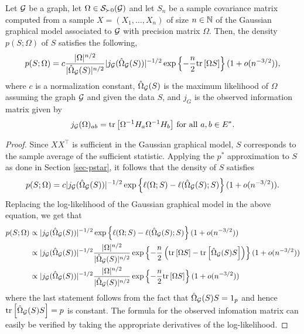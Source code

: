 \begin{lemma} \label{lem-pstar-covariance}
    Let ${\mathcal{G}}$ be a graph, let $\Omega \in {\mathcal{S}}_{\succ 0}({\mathcal{G}})$ and let $S_n$ be a sample covariance matrix computed from a sample $X = (X_1, \ldots, X_n)$ of size $n \in \mathbb{N}$ of the Gaussian graphical model associated to ${\mathcal{G}}$ with precision matrix $\Omega$. Then, the density $p(S; \Omega)$ of $S$ satisfies the following,
    \begin{equation*}
        p(S; \Omega) = c \frac{|\Omega|^{n/2}}{|\hat\Omega_{\mathcal{G}}(S)|^{n/2}} |j_{\mathcal{G}}(\hat\Omega_{\mathcal{G}}(S)) |^{-1/2} \exp\left\{-\frac{n}{2} {\textrm{tr}\left[\Omega S\right]}\right\} (1 + o(n^{-3/2})),
    \end{equation*}
    where $c$ is a normalization constant, $\hat\Omega_{\mathcal{G}}(S)$ is the maximum likelihood of $\Omega$ assuming the graph ${\mathcal{G}}$ and given the data $S$, and $j_G$ is the observed information matrix given by
    \begin{equation} \label{eq-obs-info}
        j_{\mathcal{G}}(\Omega)_{a b} = {\textrm{tr}\left[\Omega^{-1} H_a \Omega^{-1} H_b\right]} {\textrm{ for all }} a, b  \in E^*.
    \end{equation}
\end{lemma}

\begin{proof}
    Since $XX^\top$ is sufficient in the Gaussian graphical model, $S$ corresponds to the sample average of the sufficient statistic. Applying the $p^*$ approximation to $S$ as done in Section \ref{sec-pstar}, it follows that the density of $S$ satisfies
    \begin{equation*}
        p(S; \Omega) = c |j_{\mathcal{G}}(\hat\Omega_{\mathcal{G}}(S))|^{-1/2} \exp\left\{\ell(\Omega; S) - \ell(\hat\Omega_{\mathcal{G}}(S); S)\right\} (1 + o(n^{-3/2})).
    \end{equation*}
    Replacing the log-likelihood of the Gaussian graphical model in the above equation, we get that
    \begin{align*}
        p(S; \Omega) 
        &\propto |j_{\mathcal{G}}(\hat\Omega_{\mathcal{G}}(S))|^{-1/2} \exp\left\{\ell(\Omega; S) - \ell(\hat\Omega_{\mathcal{G}}(S); S)\right\} (1 + o(n^{-3/2})) \\
        &\propto |j_{\mathcal{G}}(\hat\Omega_{\mathcal{G}}(S))|^{-1/2} 
        \frac{|\Omega|^{n/2}}{|\hat\Omega_{\mathcal{G}}(S)|^{n/2}}
        \exp\left\{-\frac{n}{2}\left({\textrm{tr}\left[\Omega S\right]} - {\textrm{tr}\left[\hat\Omega_{\mathcal{G}}(S) S\right]}\right)\right\} (1 + o(n^{-3/2}))\\
        &\propto |j_{\mathcal{G}}(\hat\Omega_{\mathcal{G}}(S))|^{-1/2} 
        \frac{|\Omega|^{n/2}}{|\hat\Omega_{\mathcal{G}}(S)|^{n/2}}
        \exp\left\{-\frac{n}{2}{\textrm{tr}\left[\Omega S\right]}\right\} (1 + o(n^{-3/2}))
    \end{align*}
    where the last statement follows from the fact that $\hat\Omega_{\mathcal{G}}(S) S = 1_p$ and hence ${\textrm{tr}\left[\hat\Omega_{\mathcal{G}}(S) S\right]} = p$ is constant. The formula for the observed infomation matrix can easily be verified by taking the appropriate derivatives of the log-likelihood.
\end{proof}

